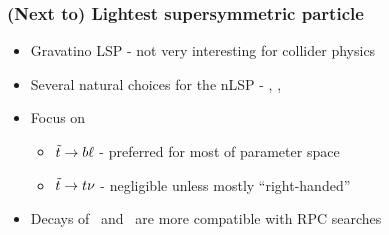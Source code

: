 \documentclass[10pt, svgnames]{beamer}
\begin{document}
\begin{frame}
  \frametitle{(Next to) Lightest supersymmetric particle}
  \begin{itemize}
    \item Gravatino LSP - not very interesting for collider physics
    \item Several natural choices for the nLSP - \stop, \sbottom, \stau
    \item Focus on \stop
      \begin{itemize}
        \item {\color{nice_blue}$\tilde{t} \rightarrow b\ell$} - preferred for most of
          parameter space
        \item $\tilde{t} \rightarrow t\nu$ - negligible unless mostly ``right-handed'' \stop
      \end{itemize}
    \item Decays of \sbottom\ and \stau\ are more compatible with RPC searches
  \end{itemize}

  \vspace{1ex}


\end{frame}
\end{document}
